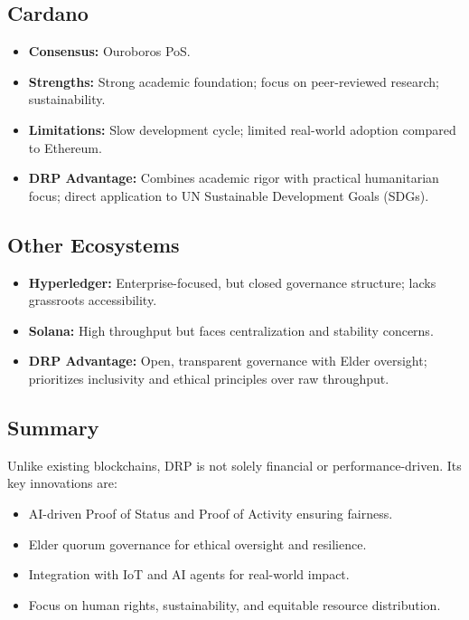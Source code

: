 \documentclass[11pt,a4paper]{article}
\begin{document}
\subsection{Cardano}
\begin{itemize}
    \item \textbf{Consensus:} Ouroboros PoS.
    \item \textbf{Strengths:} Strong academic foundation; focus on peer-reviewed research; sustainability.
    \item \textbf{Limitations:} Slow development cycle; limited real-world adoption compared to Ethereum.
    \item \textbf{DRP Advantage:} Combines academic rigor with practical humanitarian focus; direct application to UN Sustainable Development Goals (SDGs).
\end{itemize}

\subsection{Other Ecosystems}
\begin{itemize}
    \item \textbf{Hyperledger:} Enterprise-focused, but closed governance structure; lacks grassroots accessibility.
    \item \textbf{Solana:} High throughput but faces centralization and stability concerns.
    \item \textbf{DRP Advantage:} Open, transparent governance with Elder oversight; prioritizes inclusivity and ethical principles over raw throughput.
\end{itemize}

\subsection{Summary}
Unlike existing blockchains, DRP is not solely financial or performance-driven. Its key innovations are:
\begin{itemize}
    \item AI-driven Proof of Status and Proof of Activity ensuring fairness.
    \item Elder quorum governance for ethical oversight and resilience.
    \item Integration with IoT and AI agents for real-world impact.
    \item Focus on human rights, sustainability, and equitable resource distribution.
\end{itemize}
\end{document}
